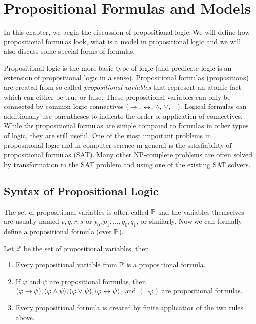 
\chapter{Propositional Formulas and Models}

In this chapter, we begin the discussion of propositional logic. We will define how propositional formulas look, what is a model in propositional logic and we will also discuss some special forms of formulas.

Propositional logic is the more basic type of logic (and predicate logic is an extension of propositional logic in a sense).  Propositional formulas (propositions) are created from so-called \emph{propositional variables} that represent an atomic fact which can either be true or false. These propositional variables can only be connected by common logic connectives ($\to$, $\leftrightarrow$, $\land$, $\lor$, $\neg$). Logical formulas can additionally use parentheses to indicate the order of application of connectives. While the propositional formulas are simple compared to formulas in other types of logic, they are still useful. One of the most important problems in propositional logic and in computer science in general is the satisfiability of propositional formulas (SAT). Many other NP-complete problems are often solved by transformation to the SAT problem and using one of the existing SAT solvers.

\section{Syntax of Propositional Logic}

The set of propositional variables is often called $\mathbb{P}$ and the variables themselves are usually named $p, q, r, s$ or $p_0, p_1, \dots, q_0, q_1$, or similarly. Now we can formally define a propositional formula (over $\mathbb{P}$).

\begin{definition}
Let $\mathbb{P}$ be the set of propositional variables, then
\begin{enumerate}
  \item Every propositional variable from $\mathbb{P}$ is a propositional formula.
  \item If $\varphi$ and $\psi$ are propositional formulas, then $(\varphi \to \psi), (\varphi \land \psi), (\varphi \lor \psi), (\varphi \leftrightarrow \psi)$, and $(\neg \varphi)$ are propositional formulas.
  \item Every propositional formula is created by finite application of the two rules above.
\end{enumerate}
\end{definition}

